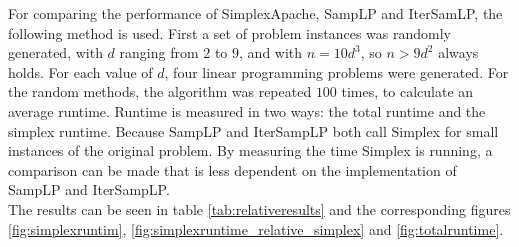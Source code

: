 \documentclass[nocopyrightspace]{acm_proc_article-sp}
\begin{document}
For comparing the performance of SimplexApache, SampLP and IterSamLP, the following method is used. First a set of problem instances was randomly generated, with $d$ ranging from $2$ to $9$, and with $n = 10d^3$, so $n > 9d^2$ always holds. For each value of $d$, four linear programming problems were generated. For the random methods, the algorithm was repeated $100$ times, to calculate an average runtime. Runtime is measured in two ways: the total runtime and the simplex runtime. Because SampLP and IterSampLP both call Simplex for small instances of the original problem. By measuring the time Simplex is running, a comparison can be made that is less dependent on the implementation of SampLP and IterSampLP. \\
The results can be seen in table \ref{tab:relativeresults} and the corresponding figures \ref{fig:simplexruntim}, \ref{fig:simplexruntime_relative_simplex} and \ref{fig:totalruntime}.
\end{document}
